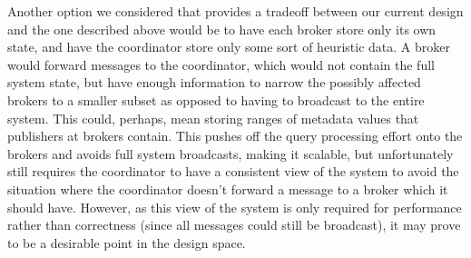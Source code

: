 Another option we considered that provides a tradeoff between our current design and the one described above would be to have each broker store only its own state, and have the coordinator store only some sort of heuristic data.
A broker would forward messages to the coordinator, which would not contain the full system state, but have enough information to narrow the possibly affected brokers to a smaller subset as opposed to having to broadcast to the entire system.
This could, perhaps, mean storing ranges of metadata values that publishers at brokers contain.
This pushes off the query processing effort onto the brokers and avoids full system broadcasts, making it scalable, but unfortunately still requires the coordinator to have a consistent view of the system to avoid the situation where the coordinator doesn't forward a message to a broker which it should have.
However, as this view of the system is only required for performance rather than correctness (since all messages could still be broadcast), it may prove to be a desirable point in the design space.

